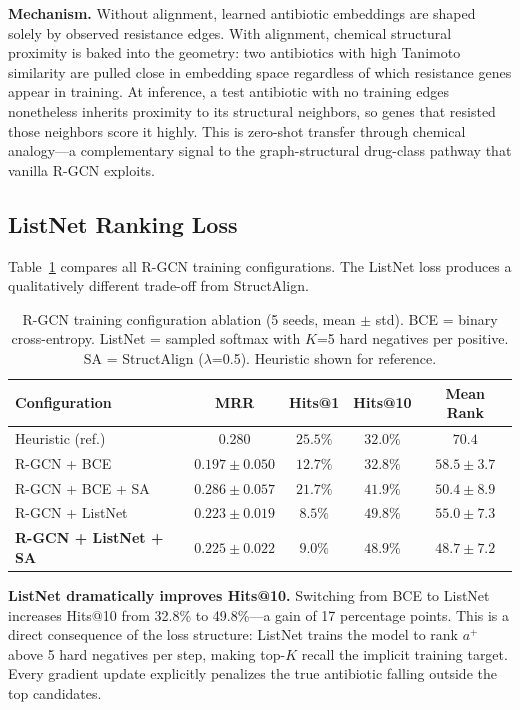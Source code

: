\documentclass[conference]{IEEEtran}
\begin{document}
\textbf{Mechanism.} Without alignment, learned antibiotic embeddings are shaped solely by observed resistance edges. With alignment, chemical structural proximity is baked into the geometry: two antibiotics with high Tanimoto similarity are pulled close in embedding space regardless of which resistance genes appear in training. At inference, a test antibiotic with no training edges nonetheless inherits proximity to its structural neighbors, so genes that resisted those neighbors score it highly. This is zero-shot transfer through chemical analogy---a complementary signal to the graph-structural drug-class pathway that vanilla R-GCN exploits.

\subsection{ListNet Ranking Loss}
\label{sec:listnet_results}

Table~\ref{tab:listnet} compares all R-GCN training configurations. The ListNet loss produces a qualitatively different trade-off from StructAlign.

\begin{table}[h]
\centering
\caption{R-GCN training configuration ablation (5 seeds, mean $\pm$ std). BCE = binary cross-entropy. ListNet = sampled softmax with $K$=5 hard negatives per positive. SA = StructAlign ($\lambda$=0.5). Heuristic shown for reference.}
\label{tab:listnet}
\begin{tabular}{lcccc}
\toprule
\textbf{Configuration} & \textbf{MRR} & \textbf{Hits@1} & \textbf{Hits@10} & \textbf{Mean Rank} \\
\midrule
Heuristic (ref.)           & $0.280$           & $25.5\%$ & $32.0\%$ & $70.4$ \\
\midrule
R-GCN + BCE                & $0.197 \pm 0.050$ & $12.7\%$ & $32.8\%$ & $58.5 \pm 3.7$ \\
R-GCN + BCE + SA           & $0.286 \pm 0.057$ & $21.7\%$ & $41.9\%$ & $50.4 \pm 8.9$ \\
R-GCN + ListNet            & $0.223 \pm 0.019$ & $8.5\%$  & $\mathbf{49.8\%}$ & $55.0 \pm 7.3$ \\
\textbf{R-GCN + ListNet + SA} & $0.225 \pm 0.022$ & $9.0\%$ & $48.9\%$ & $\mathbf{48.7 \pm 7.2}$ \\
\bottomrule
\end{tabular}
\end{table}

\textbf{ListNet dramatically improves Hits@10.} Switching from BCE to ListNet increases Hits@10 from 32.8\% to 49.8\%---a gain of 17 percentage points. This is a direct consequence of the loss structure: ListNet trains the model to rank $a^+$ above 5 hard negatives per step, making top-$K$ recall the implicit training target. Every gradient update explicitly penalizes the true antibiotic falling outside the top candidates.
\end{document}
